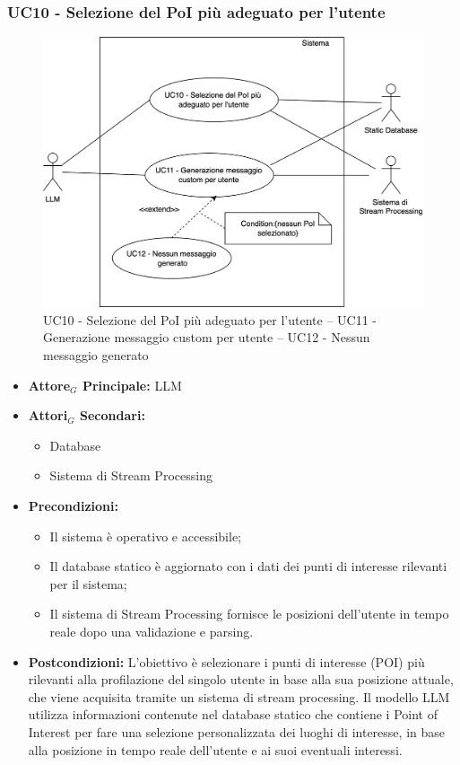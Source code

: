 \documentclass[11pt]{article}
\begin{document}
\begin{justify}
\subsubsection{\textbf{UC10 - Selezione del PoI più adeguato per l'utente}}
\begin{figure}[H]
    \centering
    \includegraphics[width=0.7\linewidth]{UC101112image.png}
    \caption{UC10 - Selezione del PoI più adeguato per l'utente -- UC11 - Generazione messaggio custom per utente -- UC12 - Nessun messaggio generato}
    \label{fig:UC101112}
\end{figure}
\label{UC10}
\begin{itemize}
    \item \textbf{Attore$_G$ Principale:} LLM
    \item \textbf{Attori$_G$ Secondari:} 
    \begin{itemize}
        \item Database
        \item Sistema di Stream Processing
    \end{itemize}
    \item \textbf{Precondizioni:} 
        \begin{itemize}
          \item Il sistema è operativo e accessibile;
            \item Il database statico è aggiornato con i dati dei punti di interesse rilevanti per il sistema;
            \item Il sistema di Stream Processing fornisce le posizioni dell'utente in tempo reale dopo una validazione e parsing.
        \end{itemize}
      \item \textbf{Postcondizioni:} L'obiettivo è selezionare i punti di interesse (POI) più rilevanti alla profilazione del singolo utente in base alla sua posizione attuale, che viene acquisita tramite un sistema di stream processing. Il modello LLM utilizza informazioni contenute nel database statico che contiene i Point of Interest per fare una selezione personalizzata dei luoghi di interesse, in base alla posizione in tempo reale dell'utente e ai suoi eventuali interessi.\\

\end{itemize}
\end{justify}
\end{document}

